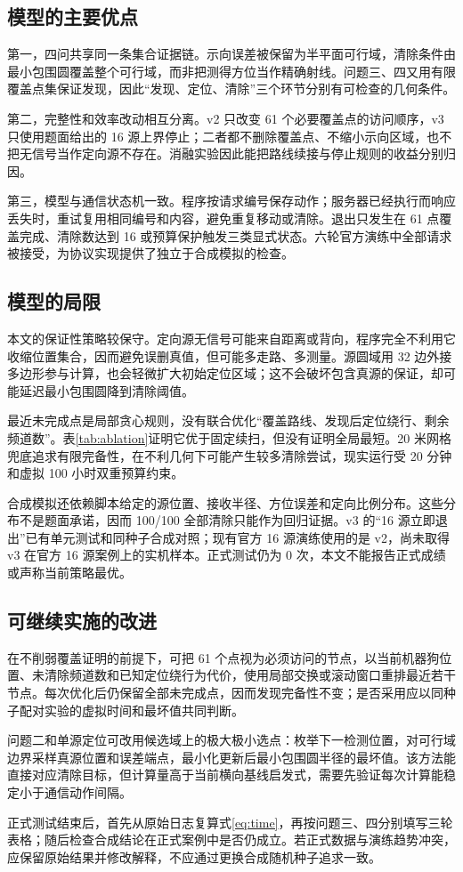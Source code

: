 \subsection{模型的主要优点}

第一，四问共享同一条集合证据链。示向误差被保留为半平面可行域，清除条件由最小包围圆覆盖整个可行域，而非把测得方位当作精确射线。问题三、四又用有限覆盖点集保证发现，因此“发现、定位、清除”三个环节分别有可检查的几何条件。

第二，完整性和效率改动相互分离。v2 只改变 61 个必要覆盖点的访问顺序，v3 只使用题面给出的 16 源上界停止；二者都不删除覆盖点、不缩小示向区域，也不把无信号当作定向源不存在。消融实验因此能把路线续接与停止规则的收益分别归因。

第三，模型与通信状态机一致。程序按请求编号保存动作；服务器已经执行而响应丢失时，重试复用相同编号和内容，避免重复移动或清除。退出只发生在 61 点覆盖完成、清除数达到 16 或预算保护触发三类显式状态。六轮官方演练中全部请求被接受，为协议实现提供了独立于合成模拟的检查。

\subsection{模型的局限}

本文的保证性策略较保守。定向源无信号可能来自距离或背向，程序完全不利用它收缩位置集合，因而避免误删真值，但可能多走路、多测量。源圆域用 32 边外接多边形参与计算，也会轻微扩大初始定位区域；这不会破坏包含真源的保证，却可能延迟最小包围圆降到清除阈值。

最近未完成点是局部贪心规则，没有联合优化“覆盖路线、发现后定位绕行、剩余频道数”。表\ref{tab:ablation}证明它优于固定续扫，但没有证明全局最短。20 米网格兜底追求有限完备性，在不利几何下可能产生较多清除尝试，现实运行受 20 分钟和虚拟 100 小时双重预算约束。

合成模拟还依赖脚本给定的源位置、接收半径、方位误差和定向比例分布。这些分布不是题面承诺，因而 100/100 全部清除只能作为回归证据。v3 的“16 源立即退出”已有单元测试和同种子合成对照；现有官方 16 源演练使用的是 v2，尚未取得 v3 在官方 16 源案例上的实机样本。正式测试仍为 0 次，本文不能报告正式成绩或声称当前策略最优。

\subsection{可继续实施的改进}

在不削弱覆盖证明的前提下，可把 61 个点视为必须访问的节点，以当前机器狗位置、未清除频道数和已知定位绕行为代价，使用局部交换或滚动窗口重排最近若干节点。每次优化后仍保留全部未完成点，因而发现完备性不变；是否采用应以同种子配对实验的虚拟时间和最坏值共同判断。

问题二和单源定位可改用候选域上的极大极小选点：枚举下一检测位置，对可行域边界采样真源位置和误差端点，最小化更新后最小包围圆半径的最坏值。该方法能直接对应清除目标，但计算量高于当前横向基线启发式，需要先验证每次计算能稳定小于通信动作间隔。

正式测试结束后，首先从原始日志复算式\eqref{eq:time}，再按问题三、四分别填写三轮表格；随后检查合成结论在正式案例中是否仍成立。若正式数据与演练趋势冲突，应保留原始结果并修改解释，不应通过更换合成随机种子追求一致。
